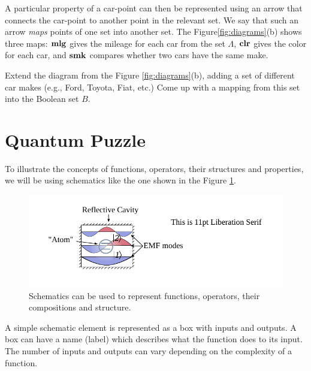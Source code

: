 A particular property of a car-point
can then be represented using an arrow that connects the car-point to
another point in the relevant set. We say that such an arrow \emph{maps}
points of one set into another set. The Figure\ref{fig:diagrams}(b)
shows three maps: $\textrm{\bf mlg}$ gives the mileage for each car from the
set $\Lambda$, $\textrm{\bf clr}$ gives the color for each car, and
$\textrm{\bf smk}$ compares whether two cars have the same make.

\begin{exercise}
Extend the diagram from the Figure \ref{fig:diagrams}(b), adding a set
of different car makes (e.g., Ford, Toyota, Fiat, etc.) Come up with a
mapping from this set into the Boolean set $B$.
\label{exe:carMakesSet}
\end{exercise}

\section{Quantum Puzzle}
To illustrate the concepts of functions, operators, their structures and
properties, we will be using schematics like the one
shown in the Figure \ref{fig:schematicExample}.
\begin{figure}%
  \includegraphics[scale=1.0]{defaultFigureTemplate}
  \caption{Schematics can be used to represent functions, operators,
    their compositions and structure.}
  \label{fig:schematicExample}
\end{figure}

A simple schematic element is represented as a box with inputs
and outputs. A box can have a name (label) which describes what the
function does to its input.  The number of inputs and
outputs can vary depending on the complexity of a function.

\

\vspace{1cm}
